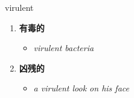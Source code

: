 
\begin{frame}
{\huge virulent}
\begin{center}
\begin{enumerate}\Large
  \item \textbf{有毒的}
  \begin{itemize}
    \item \em{\Large{virulent bacteria}}
  \end{itemize}
  \item \textbf{凶残的}
  \begin{itemize}
    \item \em{\Large{a virulent look on his face}}
  \end{itemize}
\end{enumerate}
\end{center}
\end{frame}
